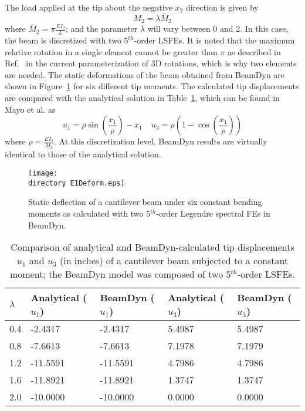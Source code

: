 The load applied at the tip about the negative $x_2$ direction is given by 
\begin{equation}
    \label{E1Load}
    M_2 = \lambda \bar{M}_2
\end{equation}
where $\bar{M}_2 = \pi \frac{EI_2}{L}$; and the parameter $\lambda$ will vary between $0$ and $2$. In 
this case, the beam is discretized with two $5^{th}$-order LSFEs. It is noted that the maximum relative rotation in a single element cannot be greater than $\pi$ as described in Ref.~\cite{Bauchau-etal:2008} in the current parameterization of 3D rotations, which is why two elements are needed. The static deformations of the beam obtained from BeamDyn are shown in
Figure~\ref{E1Deform} for six different tip moments.
The calculated tip displacements are compared with the analytical solution
in Table~\ref{E1u},
which can be found in Mayo et al.\cite{Mayo-etal:2004} as
\begin{equation}
    \label{E1Analytical}
    u_1 = \rho \sin \left( \frac{x_1}{\rho} \right) - x_1~~~~~u_3 = \rho
\left(1-\cos\left(\frac{x_1}{\rho}\right) \right)
\end{equation}
where $\rho = \frac{EI_2}{M_2}$. At this discretization level, BeamDyn results are virtually
identical to those of the analytical solution.

\begin{figure}
    \centering
    \texttt{[image: \\directory E1Deform.eps]}

    \caption{Static deflection of a cantilever beam under six constant
bending moments as calculated with two 5$^{th}$-order Legendre spectral
FEs in BeamDyn.}

    \label{E1Deform}
\end{figure}

\begin{table}[tbp]
\centering \caption{Comparison of analytical and BeamDyn-calculated tip
displacements $u_1$ and $u_3$ (in inches) of a cantilever beam subjected to a constant moment; the BeamDyn model was composed of two 5$^{th}$-order LSFEs.}
\label{E1u} 
	\begin{tabular}{| l | l | l | l | l | }
    	\hline
    	$\lambda$ & Analytical ($u_1$) & BeamDyn ($u_1$) & Analytical ($u_3$) & BeamDyn ($u_3$)  
	\\ \hline
    	0.4       & -2.4317    & -2.4317  & 5.4987     & 5.4987
	\\ \hline
    	0.8       & -7.6613    & -7.6613  & 7.1978     & 7.1979
	\\ \hline
    	1.2       & -11.5591   & -11.5591 & 4.7986     & 4.7986
	\\ \hline
    	1.6       & -11.8921   & -11.8921 & 1.3747     & 1.3747
	\\ \hline
    	2.0       & -10.0000   & -10.0000 & 0.0000     & 0.0000
	\\ \hline
    \end{tabular}
\end{table}

